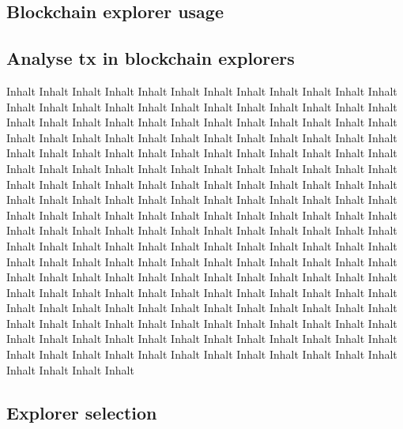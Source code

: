 \documentclass[11pt,a4paper,titlepage]{scrartcl}
\begin{document}
\subsection{Blockchain explorer usage}
\subsection{Analyse tx in blockchain explorers}
Inhalt Inhalt Inhalt Inhalt Inhalt Inhalt Inhalt Inhalt Inhalt Inhalt Inhalt Inhalt Inhalt Inhalt Inhalt Inhalt Inhalt Inhalt Inhalt Inhalt Inhalt Inhalt Inhalt Inhalt Inhalt Inhalt Inhalt Inhalt Inhalt Inhalt Inhalt Inhalt Inhalt Inhalt Inhalt Inhalt Inhalt Inhalt Inhalt Inhalt Inhalt Inhalt Inhalt Inhalt Inhalt Inhalt Inhalt Inhalt Inhalt Inhalt Inhalt Inhalt Inhalt Inhalt Inhalt Inhalt Inhalt Inhalt Inhalt Inhalt Inhalt Inhalt Inhalt Inhalt Inhalt Inhalt Inhalt Inhalt Inhalt Inhalt Inhalt Inhalt Inhalt Inhalt Inhalt Inhalt Inhalt Inhalt Inhalt Inhalt Inhalt Inhalt Inhalt Inhalt Inhalt Inhalt Inhalt Inhalt Inhalt Inhalt Inhalt Inhalt Inhalt Inhalt Inhalt Inhalt Inhalt Inhalt Inhalt Inhalt Inhalt Inhalt Inhalt Inhalt Inhalt Inhalt Inhalt Inhalt Inhalt Inhalt Inhalt Inhalt Inhalt Inhalt Inhalt Inhalt Inhalt Inhalt Inhalt Inhalt Inhalt Inhalt Inhalt Inhalt Inhalt Inhalt Inhalt Inhalt Inhalt Inhalt Inhalt Inhalt Inhalt Inhalt Inhalt Inhalt Inhalt Inhalt Inhalt Inhalt Inhalt Inhalt Inhalt Inhalt Inhalt Inhalt Inhalt Inhalt Inhalt Inhalt Inhalt Inhalt Inhalt Inhalt Inhalt Inhalt Inhalt Inhalt Inhalt Inhalt Inhalt Inhalt Inhalt Inhalt Inhalt Inhalt Inhalt Inhalt Inhalt Inhalt Inhalt Inhalt Inhalt Inhalt Inhalt Inhalt Inhalt Inhalt Inhalt Inhalt Inhalt Inhalt Inhalt Inhalt Inhalt Inhalt Inhalt Inhalt Inhalt Inhalt Inhalt Inhalt Inhalt Inhalt Inhalt Inhalt Inhalt Inhalt Inhalt Inhalt Inhalt Inhalt Inhalt Inhalt Inhalt Inhalt Inhalt Inhalt Inhalt Inhalt Inhalt Inhalt Inhalt Inhalt Inhalt Inhalt Inhalt Inhalt Inhalt Inhalt  
\subsection{Explorer selection}
\end{document}
